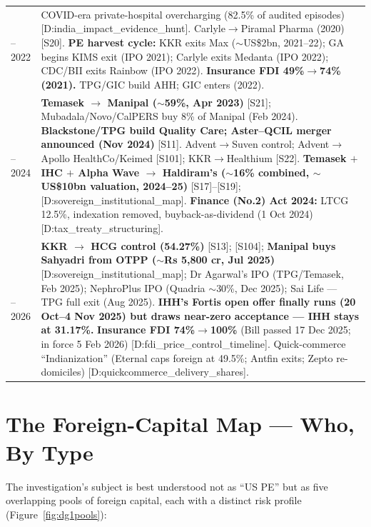 \documentclass[11pt,a4paper]{article}
\newcommand{\cs}[1]{\textnormal{[#1]}}
\begin{document}
\begin{small}
\begin{longtable}{>{\raggedright\arraybackslash}p{1.7cm} >{\raggedright\arraybackslash}p{13.5cm}}
2020--2022 & COVID-era private-hospital overcharging (82.5\% of audited episodes) \cs{D:india\_impact\_evidence\_hunt}. Carlyle$\rightarrow$Piramal Pharma (2020) \cs{S20}. \textbf{PE harvest cycle:} KKR exits Max ($\sim$US\$2bn, 2021--22); GA begins KIMS exit (IPO 2021); Carlyle exits Medanta (IPO 2022); CDC/BII exits Rainbow (IPO 2022). \textbf{Insurance FDI 49\%$\rightarrow$74\% (2021).} TPG/GIC build AHH; GIC enters (2022). \\
2023--2024 & \textbf{Temasek $\rightarrow$ Manipal ($\sim$59\%, Apr 2023)} \cs{S21}; Mubadala/Novo/CalPERS buy 8\% of Manipal (Feb 2024). \textbf{Blackstone/TPG build Quality Care; Aster--QCIL merger announced (Nov 2024)} \cs{S11}. Advent$\rightarrow$Suven control; Advent$\rightarrow$Apollo HealthCo/Keimed \cs{S101}; KKR$\rightarrow$Healthium \cs{S22}. \textbf{Temasek $+$ IHC $+$ Alpha Wave $\rightarrow$ Haldiram's ($\sim$16\% combined, $\sim$US\$10bn valuation, 2024--25)} \cs{S17}--\cs{S19}; \cs{D:sovereign\_institutional\_map}. \textbf{Finance (No.2) Act 2024:} LTCG 12.5\%, indexation removed, buyback-as-dividend (1 Oct 2024) \cs{D:tax\_treaty\_structuring}. \\
2025--2026 & \textbf{KKR $\rightarrow$ HCG control (54.27\%)} \cs{S13}; \cs{S104}; \textbf{Manipal buys Sahyadri from OTPP ($\sim$Rs 5{,}800 cr, Jul 2025)} \cs{D:sovereign\_institutional\_map}; Dr Agarwal's IPO (TPG/Temasek, Feb 2025); NephroPlus IPO (Quadria $\sim$30\%, Dec 2025); Sai Life --- TPG full exit (Aug 2025). \textbf{IHH's Fortis open offer finally runs (20 Oct--4 Nov 2025) but draws near-zero acceptance --- IHH stays at 31.17\%.} \textbf{Insurance FDI 74\%$\rightarrow$100\%} (Bill passed 17 Dec 2025; in force 5 Feb 2026) \cs{D:fdi\_price\_control\_timeline}. Quick-commerce ``Indianization'' (Eternal caps foreign at 49.5\%; Antfin exits; Zepto re-domiciles) \cs{D:quickcommerce\_delivery\_shares}. \\
\end{longtable}
\end{small}

\section{The Foreign-Capital Map --- Who, By Type}\label{sec:capitalmap}
The investigation's subject is best understood not as ``US PE'' but as five overlapping pools of foreign capital, each with a distinct risk profile (Figure~\ref{fig:dg1pools}):
\end{document}
